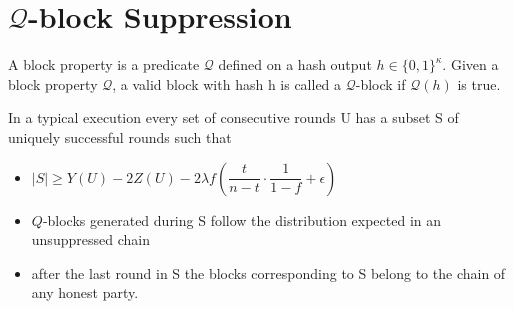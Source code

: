 \section{$\mathcal{Q}$-block Suppression}
\begin{definition}
    \cite{dionyziz}
    A block property is a predicate $\mathcal{Q}$ defined on a hash output $h \in \{ 0, 1 \}^\kappa$. Given  a block property $\mathcal{Q}$, a valid block with hash h is called a $\mathcal{Q}$-block if $\mathcal{Q}(h)$ is true.
\end{definition}

\begin{lemma}[Unsuppressibility]\cite{dionyziz}
    In a typical execution every set of consecutive rounds U has a subset S of uniquely successful rounds such that
    \begin{itemize}
        \item $\lvert S \rvert \geq Y(U) - 2Z(U) - 2 \lambda f (\dfrac{t}{n-t} \cdot \dfrac{1}{1-f} + \epsilon)$
        \item $Q$-blocks generated during S follow the distribution expected in an unsuppressed chain
        \item after the last round in S the blocks corresponding to S belong to the chain of any honest party.
    \end{itemize}
\end{lemma}

